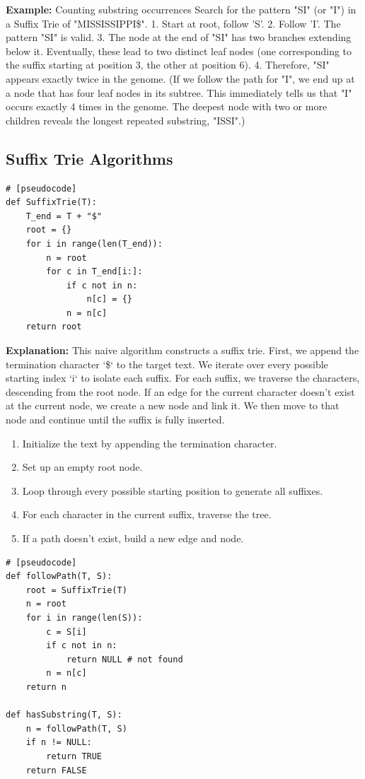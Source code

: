 \textbf{Example:} Counting substring occurrences
Search for the pattern "SI" (or "I") in a Suffix Trie of "MISSISSIPPI\$".
1. Start at root, follow 'S'.
2. Follow 'I'. The pattern "SI" is valid.
3. The node at the end of "SI" has two branches extending below it. Eventually, these lead to two distinct leaf nodes (one corresponding to the suffix starting at position 3, the other at position 6).
4. Therefore, "SI" appears exactly twice in the genome.
(If we follow the path for "I", we end up at a node that has four leaf nodes in its subtree. This immediately tells us that "I" occurs exactly 4 times in the genome. The deepest node with two or more children reveals the longest repeated substring, "ISSI".)

\subsection{Suffix Trie Algorithms}

\begin{verbatim}
# [pseudocode]
def SuffixTrie(T):
    T_end = T + "$"
    root = {}
    for i in range(len(T_end)):
        n = root
        for c in T_end[i:]:
            if c not in n:
                n[c] = {}
            n = n[c]
    return root
\end{verbatim}

\textbf{Explanation:} This naive algorithm constructs a suffix trie. First, we append the termination character `\$` to the target text. We iterate over every possible starting index `i` to isolate each suffix. For each suffix, we traverse the characters, descending from the root node. If an edge for the current character doesn't exist at the current node, we create a new node and link it. We then move to that node and continue until the suffix is fully inserted.

\begin{enumerate}
    \item Initialize the text by appending the termination character.
    \item Set up an empty root node.
    \item Loop through every possible starting position to generate all suffixes.
    \item For each character in the current suffix, traverse the tree.
    \item If a path doesn't exist, build a new edge and node.
\end{enumerate}

\begin{verbatim}
# [pseudocode]
def followPath(T, S):
    root = SuffixTrie(T)
    n = root
    for i in range(len(S)):
        c = S[i]
        if c not in n:
            return NULL # not found
        n = n[c]
    return n

def hasSubstring(T, S):
    n = followPath(T, S)
    if n != NULL:
        return TRUE
    return FALSE
\end{verbatim}

